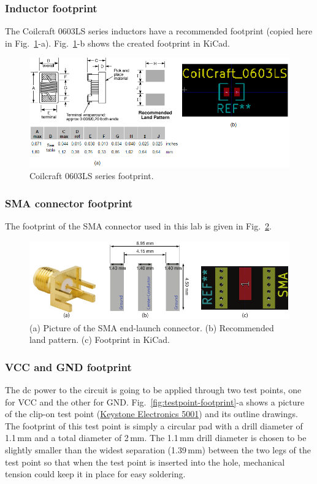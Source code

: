 \documentclass[12pt,letterpaper]{scrartcl}
\begin{document}
\subsubsection{Inductor footprint}

The Coilcraft 0603LS series inductors have a recommended footprint (copied here in Fig.~\ref{fig:cc-0603ls}-a). Fig.~\ref{fig:cc-0603ls}-b shows the created footprint in KiCad. 

	\begin{figure}[hp]
		\centering
		\includegraphics[width=6in]{cc-0603ls}
		\caption{Coilcraft 0603LS series footprint.}
		\label{fig:cc-0603ls}
	\end{figure}

\subsubsection{SMA connector footprint}
The footprint of the SMA connector used in this lab is given in Fig.~\ref{fig:sma-footprint}. 

	\begin{figure}[hp]
		\centering
		\includegraphics[width=5.5in]{sma-footprint}
		\caption{(a) Picture of the SMA end-launch connector. (b) Recommended land pattern. (c) Footprint in KiCad.}
		\label{fig:sma-footprint}
	\end{figure}

\subsubsection{VCC and GND footprint}
The dc power to the circuit is going to be applied through two test points, one for VCC and the other for GND. Fig.~\ref{fig:testpoint-footprint}-a shows a picture of the clip-on test point (\href{http://www.digikey.com/product-detail/en/5001/5001K-ND/255327}{Keystone Electronics 5001}) and its outline drawings. The footprint of this test point is simply a circular pad with a drill diameter of 1.1\,mm and a total diameter of 2\,mm. The 1.1\,mm drill diameter is chosen to be slightly smaller than the widest separation (1.39\,mm) between the two legs of the test point so that when the test point is inserted into the hole, mechanical tension could keep it in place for easy soldering. 
\end{document}
